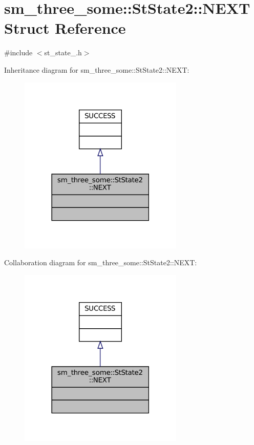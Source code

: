 \hypertarget{structsm__three__some_1_1StState2_1_1NEXT}{}\section{sm\+\_\+three\+\_\+some\+:\+:St\+State2\+:\+:N\+E\+XT Struct Reference}
\label{structsm__three__some_1_1StState2_1_1NEXT}


{\ttfamily \#include $<$st\+\_\+state\+\_.\+h$>$}



Inheritance diagram for sm\+\_\+three\+\_\+some\+:\+:St\+State2\+:\+:N\+E\+XT\+:
\nopagebreak
\begin{figure}[H]
\begin{center}
\leavevmode
\includegraphics[width=222pt]{structsm__three__some_1_1StState2_1_1NEXT__inherit__graph}
\end{center}
\end{figure}


Collaboration diagram for sm\+\_\+three\+\_\+some\+:\+:St\+State2\+:\+:N\+E\+XT\+:
\nopagebreak
\begin{figure}[H]
\begin{center}
\leavevmode
\includegraphics[width=222pt]{structsm__three__some_1_1StState2_1_1NEXT__coll__graph}
\end{center}
\end{figure}


